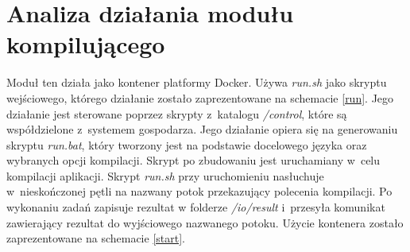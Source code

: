 \section{Analiza działania modułu kompilującego}
Moduł ten działa jako kontener platformy Docker. Używa \textit{run.sh} jako skryptu wejściowego, którego działanie zostało zaprezentowane na schemacie \ref{run}. Jego działanie jest sterowane poprzez skrypty z~katalogu \textit{/control}, które są współdzielone z~systemem gospodarza. Jego działanie opiera się na generowaniu skryptu \textit{run.bat}, który tworzony jest na podstawie docelowego języka oraz wybranych opcji kompilacji. Skrypt po zbudowaniu jest uruchamiany w~celu kompilacji aplikacji. Skrypt \textit{run.sh} przy uruchomieniu nasłuchuje w~nieskończonej pętli na nazwany potok przekazujący polecenia kompilacji. Po wykonaniu zadań zapisuje rezultat w folderze \textit{/io/result} i~przesyła komunikat zawierający rezultat do wyjściowego nazwanego potoku. Użycie kontenera zostało zaprezentowane na schemacie \ref{start}.